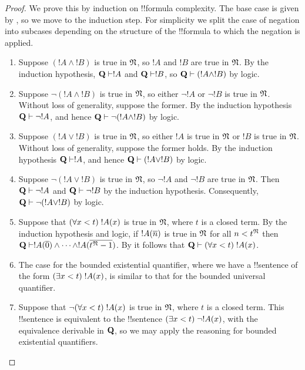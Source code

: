 \documentclass[../../../include/open-logic-section]{subfiles}
\begin{document}
\begin{proof}
We prove this by induction on !!{formula} complexity.
%
The base case is given by ,
so we move to the induction step. For simplicity we split
the case of negation into subcases depending on the
structure of the !!{formula} to which the negation is
applied.

\begin{enumerate}
\item Suppose $(!A \land !B)$ is true in $\Struct{N}$,
so $!A$ and $!B$ are true in $\Struct{N}$.
By the induction hypothesis, $\Th{Q} \Proves !A$ and
$\Th{Q} \Proves !B$,
so $\Th{Q} \Proves (!A \land !B)$ by logic.
%
\item Suppose $\lnot (!A \land !B)$ is true in $\Struct{N}$,
so either $\lnot !A$ or $\lnot !B$ is true in $\Struct{N}$.
Without loss of generality, suppose the former. By the
induction hypothesis $\Th{Q} \Proves \lnot !A$, and hence
$\Th{Q} \Proves \lnot (!A \land !B)$ by logic.
%
\item Suppose $(!A \lor !B)$ is true in $\Struct{N}$, so
either $!A$ is true in $\Struct{N}$ or $!B$ is true in
$\Struct{N}$. Without loss of generality, suppose the former
holds. By the induction hypothesis $\Th{Q} \Proves !A$, and
hence $\Th{Q} \Proves (!A \lor !B)$ by logic.
%
\item Suppose $\lnot(!A \lor !B)$ is true in $\Struct{N}$,
so $\lnot !A$ and $\lnot !B$ are true in $\Struct{N}$.
Then $\Th{Q} \Proves \lnot !A$ and $\Th{Q} \Proves \lnot !B$
by the induction hypothesis. Consequently,
$\Th{Q} \Proves \lnot(!A \lor !B)$ by logic.
%
\item Suppose that $(\forall x<t)\; !A(x)$ is true in
$\Struct{N}$, where $t$ is a closed term. By the induction
hypothesis and logic, if $!A(\overline{n})$ is true in $\Struct{N}$
for all $n < t^\Struct{N}$ then $\Th{Q} \Proves
!A(\num 0) \land \dots \land !A(\num{t^\Struct{N}-1})$.
By  it follows that
$\Th{Q} \Proves \bforall{x<t}!A(x)$.
%
\item The case for the bounded existential quantifier, where
we have a !!{sentence} of the form $(\exists x < t)\; !A(x)$,
is similar to that for the bounded universal quantifier.
%
\item Suppose that $\lnot (\forall x<t)\; !A(x)$ is true in
$\Struct{N}$, where $t$ is a closed term. This !!{sentence}
is equivalent to the !!{sentence} $(\exists x<t)\; \lnot!A(x)$,
with the equivalence derivable in $\mathbf{Q}$, so we may apply
the reasoning for bounded existential quantifiers.

\end{enumerate}
\end{proof}
\end{document}
